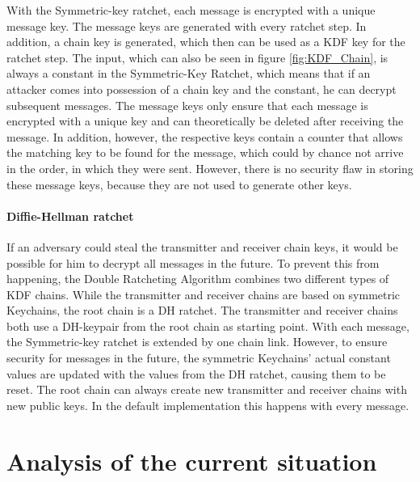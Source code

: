 \documentclass[12pt,oneside,a4paper,parskip]{scrbook}
\begin{document}
With the Symmetric-key ratchet, each message is encrypted with a unique message key. The message keys are generated with every ratchet step. In addition, a chain key is generated, which then can be used as a KDF key for the ratchet step. The input, which can also be seen in figure \ref{fig:KDF_Chain}, is always a constant in the Symmetric-Key Ratchet, which means that if an attacker comes into possession of a chain key and the constant, he can decrypt subsequent messages. The message keys only ensure that each message is encrypted with a unique key and can theoretically be deleted after receiving the message. In addition, however, the respective keys contain a counter that allows the matching key to be found for the message, which could by chance not arrive in the order, in which they were sent. However, there is no security flaw in storing these message keys, because they are not used to generate other keys.
\parencite{perrin_double_2016}

\subsubsection{Diffie-Hellman ratchet}

If an adversary could steal the transmitter and receiver chain keys, it would be possible for him to decrypt all messages in the future. To prevent this from happening, the Double Ratcheting Algorithm combines two different types of KDF chains. While the transmitter and receiver chains are based on symmetric Keychains, the root chain is a DH ratchet. The transmitter and receiver chains both use a DH-keypair from the root chain as starting point. With each message, the Symmetric-key ratchet is extended by one chain link. However, to ensure security for messages in the future, the symmetric Keychains' actual constant values are updated with the values from the DH ratchet, causing them to be reset. The root chain can always create new transmitter and receiver chains with new public keys. In the default implementation this happens with every message.
\parencite{perrin_double_2016}


\chapter{Analysis of the current situation}
\end{document}
